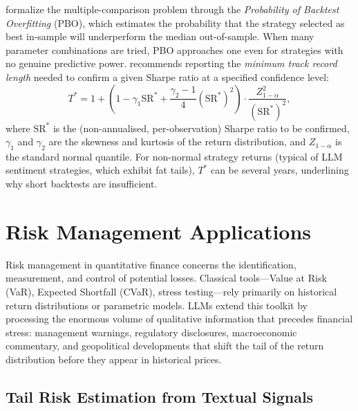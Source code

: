 \citet{bailey2014probability} formalize the multiple-comparison problem through the
\emph{Probability of Backtest Overfitting} (PBO), which estimates the probability that
the strategy selected as best in-sample will underperform the median out-of-sample. When
many parameter combinations are tried, PBO approaches one even for strategies with no
genuine predictive power. \citet{lopezdeprado2018advances} recommends reporting the \emph{minimum
track record length} needed to confirm a given Sharpe ratio at a specified confidence
level:
\begin{equation}
  T^* = 1 + \left(1 - \gamma_1 \text{SR}^* + \frac{\gamma_2 - 1}{4}
    (\text{SR}^*)^2 \right) \cdot \frac{Z_{1-\alpha}^2}{(\text{SR}^*)^2},
  \label{eq:ch10-min-track}
\end{equation}
where $\text{SR}^*$ is the (non-annualised, per-observation) Sharpe ratio to be confirmed,
$\gamma_1$ and $\gamma_2$ are the skewness and kurtosis of the return distribution,
and $Z_{1-\alpha}$ is the standard normal quantile. For non-normal strategy returns
(typical of LLM sentiment strategies, which exhibit fat tails), $T^*$ can be several
years, underlining why short backtests are insufficient.

\section{Risk Management Applications}
\label{sec:ch10-risk-management}

Risk management in quantitative finance concerns the identification, measurement, and
control of potential losses. Classical tools---Value at Risk (VaR), Expected Shortfall
(CVaR), stress testing---rely primarily on historical return distributions or
parametric models. LLMs extend this toolkit by processing the enormous volume of
qualitative information that precedes financial stress: management warnings, regulatory
disclosures, macroeconomic commentary, and geopolitical developments that shift the
tail of the return distribution before they appear in historical prices.

\subsection{Tail Risk Estimation from Textual Signals}
\label{sec:ch10-tail-risk}

